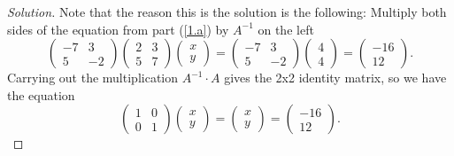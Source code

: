 \documentclass[12pt]{amsart}
\begin{document}
\begin{thm}[20 Points]
\begin{proof}[Solution]
    Note that the reason this is the solution is the following: Multiply both sides of the equation from part (\ref{1.a}) by $A^{-1}$ on the left 
    $$\left(\begin{array}{ccc}
            -7 & 3\\
            5 & -2
        \end{array}
      \right)\left(\begin{array}{cc}
        2 & 3\\
        5 & 7
      \end{array}
      \right)
      \left(\begin{array}{c}
        x\\
        y
      \end{array}
      \right)
      =
      \left(\begin{array}{ccc}
            -7 & 3\\
            5 & -2
        \end{array}
      \right)\left(\begin{array}{c}
        4\\
        4
      \end{array}
      \right) = \left(\begin{array}{c}
      -16\\
      12\end{array}\right).$$
      Carrying out the multiplication $A^{-1} \cdot A$ gives the 2x2 identity matrix, so we have the equation
      $$\left(\begin{array}{cc}
        1 & 0\\
        0 & 1
      \end{array}
      \right)\left(\begin{array}{c}
        x\\
        y
      \end{array}
      \right) = 
      \left(\begin{array}{c}
        x\\
        y
      \end{array}
      \right)
      = \left(\begin{array}{c}
      -16\\
      12\end{array}\right).$$
  \end{proof}
\end{thm}

\newpage
\end{document}
